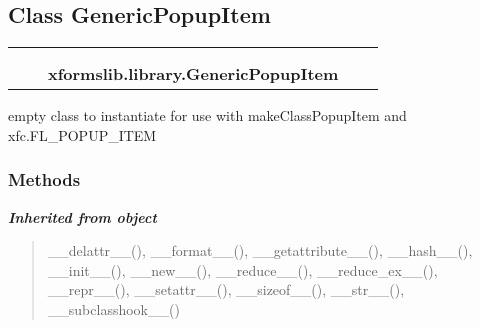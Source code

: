 

\subsection{Class GenericPopupItem}

    \label{xformslib:library:GenericPopupItem}
\begin{tabular}{cccccc}
\multicolumn{2}{r}{\settowidth{\BCL}{object}\multirow{2}{\BCL}{object}}
&&
  \\\cline{3-3}
  &&\multicolumn{1}{c|}{}
&&
  \\
&&\multicolumn{2}{l}{\textbf{xformslib.library.GenericPopupItem}}
\end{tabular}

empty class to instantiate for use with makeClassPopupItem and 
xfc.FL\_POPUP\_ITEM



  \subsubsection{Methods}


\large{\textbf{\textit{Inherited from object}}}

\begin{quote}
\_\_delattr\_\_(), \_\_format\_\_(), \_\_getattribute\_\_(), \_\_hash\_\_(), \_\_init\_\_(), \_\_new\_\_(), \_\_reduce\_\_(), \_\_reduce\_ex\_\_(), \_\_repr\_\_(), \_\_setattr\_\_(), \_\_sizeof\_\_(), \_\_str\_\_(), \_\_subclasshook\_\_()
\end{quote}


